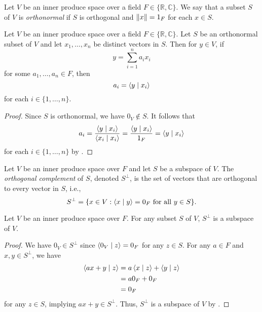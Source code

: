\begin{definition}
  Let $V$ be an inner produce space over a field
  $F \in \{\mathbb{R}, \mathbb{C}\}$.
  We say that a subset $S$ of $V$ is \emph{orthonormal} if $S$ is orthogonal
  and $\left\Vert x \right\Vert = 1_F$ for each $x \in S$.
\end{definition}

\begin{theorem}
  \label{thm:orthonormal-decomposition}
  Let $V$ be an inner produce space over a field
  $F \in \{\mathbb{R}, \mathbb{C}\}$.
  Let $S$ be an orthonormal subset of $V$ and let
  $x_1, \dots, x_n$ be distinct vectors in $S$.
  Then for $y \in V$, if
  \begin{equation*}
    y = \sum_{i=1}^n a_ix_i
  \end{equation*}
  for some $a_1, \dots, a_n \in F$, then
  \begin{equation*}
    a_i = \left\langle y \; \middle| \; x_i \right\rangle
  \end{equation*}
  for each $i \in \{1, \dots, n\}$.
\end{theorem}
\begin{proof}
  Since $S$ is orthonormal, we have $0_V \notin S$.
  It follows that
  \begin{equation*}
    a_i
    = \frac{\left\langle y \; \middle| \; x_i \right\rangle}{\left\langle x_i \; \middle| \; x_i \right\rangle}
    = \frac{\left\langle y \; \middle| \; x_i \right\rangle}{1_F}
    = \left\langle y \; \middle| \; x_i \right\rangle
  \end{equation*}
  for each $i \in \{1, \dots, n\}$ by .
\end{proof}

\begin{definition}
  Let $V$ be an inner produce space over $F$ and let $S$ be a subspace of $V$.
  The \emph{orthogonal complement} of $S$, denoted $S^\perp$, is the set of
  vectors that are orthogonal to every vector in $S$, i.e.,
  \begin{equation*}
    S^\perp = \{x \in V: \text{$\left\langle x \; \middle| \; y \right\rangle = 0_F$ for all $y \in S$}\}.
  \end{equation*}
\end{definition}

\begin{theorem}
  Let $V$ be an inner produce space over $F$.
  For any subset $S$ of $V$, $S^\perp$ is a subspace of $V$.
\end{theorem}
\begin{proof}
  We have $0_V \in S^\perp$ since $\left\langle 0_V \; \middle| \; z \right\rangle = 0_F$ for any $z \in S$.
  For any $a \in F$ and $x, y \in S^\perp$, we have
  \begin{align*}
    \left\langle ax + y \; \middle| \; z \right\rangle
    &= a\left\langle x \; \middle| \; z \right\rangle + \left\langle y \; \middle| \; z \right\rangle \\
    &= a0_F + 0_F \\
    &= 0_F
  \end{align*}
  for any $z \in S$, implying $ax + y \in S^\perp$.
  Thus, $S^\perp$ is a subspace of $V$ by .
\end{proof}

